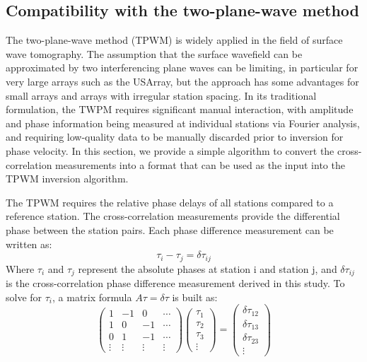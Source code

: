 \subsection{Compatibility with the two-plane-wave method}
\label{sec:TPW}
The two-plane-wave method (TPWM) \citep{Forsyth:2005id} is widely applied in the field of surface wave tomography. The assumption that the surface wavefield can be approximated by two interferencing plane waves can be limiting, in particular for very large arrays such as the USArray, but the approach has some advantages for small arrays and arrays with irregular station spacing.  In its traditional formulation, the TWPM requires significant manual interaction, with amplitude and phase information being measured at individual stations via Fourier analysis, and requiring low-quality data to be manually discarded prior to inversion for phase velocity.  In this section, we provide a simple algorithm to convert the cross-correlation measurements into a format that can be used as the input into the TPWM inversion algorithm.

The TPWM requires the relative phase delays of all stations compared to a reference station. The cross-correlation measurements provide the differential phase between the station pairs. Each phase difference measurement can be written as:
\begin{equation}
\tau_i - \tau_j = \delta \tau_{ij}
\end{equation}
Where $\tau_i$ and $\tau_j$ represent the absolute phases at station i and station j, and $\delta \tau_{ij}$ is the cross-correlation phase difference measurement derived in this study. To solve for $\tau_i$, a matrix formula $A\tau = \delta\tau$ is built as:
\begin{equation}
\left( \begin{array}{cccc}
1 & -1 & 0 & \cdots \\
1 & 0 & -1 & \cdots \\
0 & 1 & -1 & \cdots \\
\vdots &\vdots &\vdots & \vdots
\end{array} \right)
\left( \begin{array}{c}
	\tau_1 \\ 
	\tau_2 \\
	\tau_3 \\
	\vdots
\end{array} \right) = 
\left( \begin{array}{c}
	\delta \tau_{12} \\ 
	\delta \tau_{13} \\
	\delta \tau_{23} \\
	\vdots
\end{array} \right)  
\end{equation}

